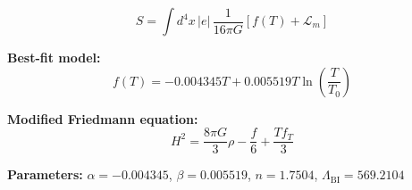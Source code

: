 
\begin{equation}
  S = \int d^4x \, |e| \, \frac{1}{16\pi G} \left[ f(T) + \mathcal{L}_m \right]
\end{equation}

\textbf{Best-fit model:}
\begin{equation}
  f(T) = -0.004345 T + 0.005519 T \ln\!\left(\frac{T}{T_0}\right)
\end{equation}

\textbf{Modified Friedmann equation:}
\begin{equation}
  H^2 = \frac{8\pi G}{3} \rho - \frac{f}{6} + \frac{T f_T}{3}
\end{equation}

\textbf{Parameters:}
$\alpha = -0.004345$, \quad
$\beta = 0.005519$, \quad
$n = 1.7504$, \quad
$\Lambda_{\text{BI}} = 569.2104$